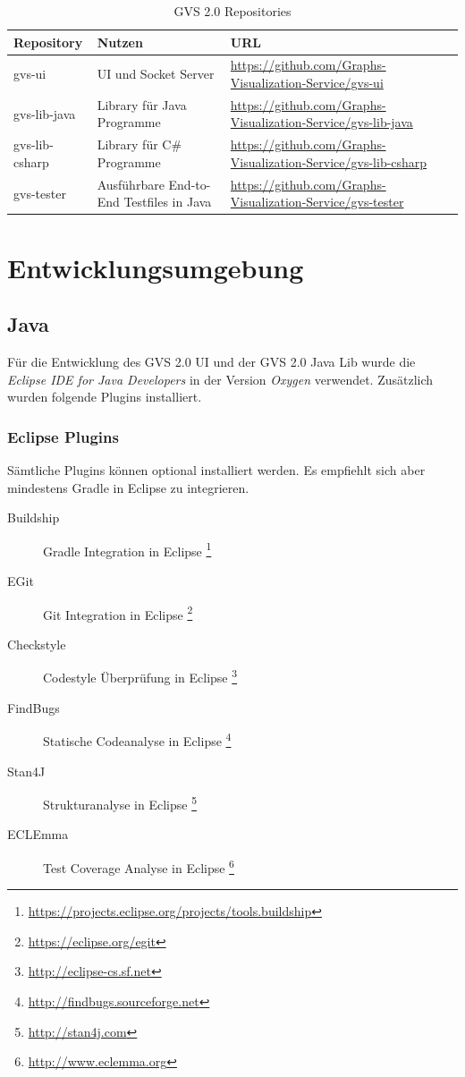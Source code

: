 \documentclass[11pt,a4paper,english,oneside]{book}
\numberwithin{equation}{chapter}
\begin{document}
	\begin{table}[h!]
		\centering
		\begin{tabularx}{\linewidth}{l l X}
			\toprule 
			Repository & Nutzen & URL \\
			\midrule
			gvs-ui & UI und Socket Server & \url{https://github.com/Graphs-Visualization-Service/gvs-ui}  \\
			gvs-lib-java & Library für Java Programme & \url{https://github.com/Graphs-Visualization-Service/gvs-lib-java} \\
			gvs-lib-csharp & Library für C\# Programme & \url{https://github.com/Graphs-Visualization-Service/gvs-lib-csharp} \\
			gvs-tester & Ausführbare End-to-End Testfiles in Java & \url{https://github.com/Graphs-Visualization-Service/gvs-tester} \\
			\bottomrule 
		\end{tabularx} 
		\caption{GVS 2.0 Repositories} 
		\label{tbl:repos}
	\end{table}

\clearpage

	\section{Entwicklungsumgebung}
	
	\subsection{Java}
	Für die Entwicklung des GVS 2.0 UI und der GVS 2.0 Java Lib wurde die \textit{Eclipse IDE for Java Developers} in der Version \textit{Oxygen} verwendet. Zusätzlich wurden folgende Plugins installiert.
	
	
	\subsubsection{Eclipse Plugins}
	Sämtliche Plugins können optional installiert werden. Es empfiehlt sich aber mindestens Gradle in Eclipse zu integrieren.
	\begin{description}
		\item[Buildship] Gradle Integration in Eclipse \footnote{\url{https://projects.eclipse.org/projects/tools.buildship}}
		\item[EGit] Git Integration in Eclipse \footnote{\url{https://eclipse.org/egit}}
		\item[Checkstyle] Codestyle Überprüfung in Eclipse \footnote{\url{http://eclipse-cs.sf.net}}
		\item[FindBugs] Statische Codeanalyse in Eclipse \footnote{\url{http://findbugs.sourceforge.net}}
		\item[Stan4J] Strukturanalyse in Eclipse \footnote{\url{http://stan4j.com}}
		\item[ECLEmma] Test Coverage Analyse in Eclipse \footnote{\url{http://www.eclemma.org}}
	\end{description}
\end{document}
